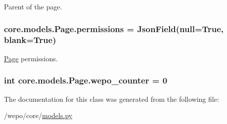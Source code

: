 Parent of the page. 

\hypertarget{classcore_1_1models_1_1Page_ac8581869cbe320c85b6be487430d23ef}{
\subsubsection[{permissions}]{\setlength{\rightskip}{0pt plus 5cm}core.\-models.\-Page.\-permissions = {\bf Json\-Field}(null=True, blank=True)\hspace{0.3cm}{\ttfamily [static]}}}\label{classcore_1_1models_1_1Page_ac8581869cbe320c85b6be487430d23ef}


\hyperlink{classcore_1_1models_1_1Page}{Page} permissions. 

\hypertarget{classcore_1_1models_1_1Page_ad187b76ce6d3fa0e61f125da2536744e}{
\subsubsection[{wepo\-\_\-counter}]{\setlength{\rightskip}{0pt plus 5cm}int core.\-models.\-Page.\-wepo\-\_\-counter = 0\hspace{0.3cm}{\ttfamily [static]}}}\label{classcore_1_1models_1_1Page_ad187b76ce6d3fa0e61f125da2536744e}


The documentation for this class was generated from the following file\-:\begin{DoxyCompactItemize}
\item 
/wepo/core/\hyperlink{models_8py}{models.\-py}\end{DoxyCompactItemize}
